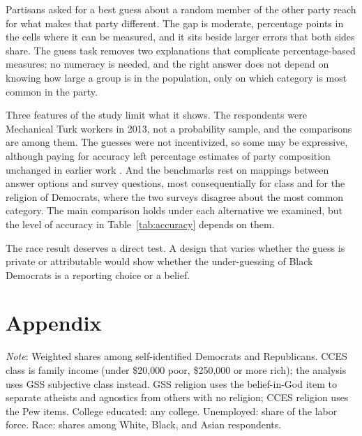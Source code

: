 \documentclass[11pt]{article}
\newcommand{\TableStyle}{\small\setlength{\tabcolsep}{5pt}\renewcommand{\arraystretch}{1.05}}
\begin{document}
Partisans asked for a best guess about a random member of the other party reach for what makes that party different. The gap is moderate, \gap{} percentage points in the cells where it can be measured, and it sits beside larger errors that both sides share. The guess task removes two explanations that complicate percentage-based measures: no numeracy is needed, and the right answer does not depend on knowing how large a group is in the population, only on which category is most common in the party.

Three features of the study limit what it shows. The respondents were Mechanical Turk workers in 2013, not a probability sample, and the comparisons are among them. The guesses were not incentivized, so some may be expressive, although paying for accuracy left percentage estimates of party composition unchanged in earlier work \citep{ahler2018parties}. And the benchmarks rest on mappings between answer options and survey questions, most consequentially for class and for the religion of Democrats, where the two surveys disagree about the most common category. The main comparison holds under each alternative we examined, but the level of accuracy in Table~\ref{tab:accuracy} depends on them.

The race result deserves a direct test. A design that varies whether the guess is private or attributable would show whether the under-guessing of Black Democrats is a reporting choice or a belief.




\clearpage
\appendix
\renewcommand{\thetable}{A\arabic{table}}
\setcounter{table}{0}
\section{Appendix}

\begin{table}[H]
\centering\TableStyle
\caption{Population shares by party, 2012 (percent).}
\label{tab:benchmarks}
\begin{minipage}{\linewidth}\footnotesize\vspace{4pt}
\emph{Note}: Weighted shares among self-identified Democrats and Republicans. CCES class is family income (under \$20,000 poor, \$250,000 or more rich); the analysis uses GSS subjective class instead. GSS religion uses the belief-in-God item to separate atheists and agnostics from others with no religion; CCES religion uses the Pew items. College educated: any college. Unemployed: share of the labor force. Race: shares among White, Black, and Asian respondents.
\end{minipage}
\end{table}
\end{document}
